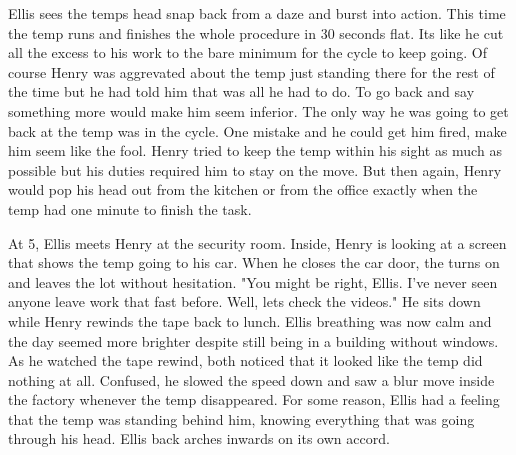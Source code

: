 \begin{Document}
        Ellis sees the temps head snap back from a daze and burst into action. This time the temp runs and finishes the whole procedure in 30 seconds flat. Its
    like he cut all the excess to his work to the bare minimum for the cycle to keep going. Of course Henry was aggrevated about the temp just standing there
    for the rest of the time but he had told him that was all he had to do. To go back and say something more would make him seem inferior. The only way he was
    going to get back at the temp was in the cycle. One mistake and he could get him fired, make him seem like the fool. Henry tried to keep the temp within his
    sight as much as possible but his duties required him to stay on the move. But then again, Henry would pop his head out from the kitchen or from the office
    exactly when the temp had one minute to finish the task.

        At 5, Ellis meets Henry at the security room. Inside, Henry is looking at a screen that shows the temp going to his car. When he closes the car door,
    the turns on and leaves the lot without hesitation. "You might be right, Ellis. I've never seen anyone leave work that fast before. Well, lets check the
    videos." He sits down while Henry rewinds the tape back to lunch. Ellis breathing was now calm and the day seemed more brighter despite still being in a
    building without windows. As he watched the tape rewind, both noticed that it looked like the temp did nothing at all. Confused, he slowed the speed down
    and saw a blur move inside the factory whenever the temp disappeared. For some reason, Ellis had a feeling that the temp was standing behind him, knowing
    everything that was going through his head. Ellis back arches inwards on its own accord.
\end{Document}
